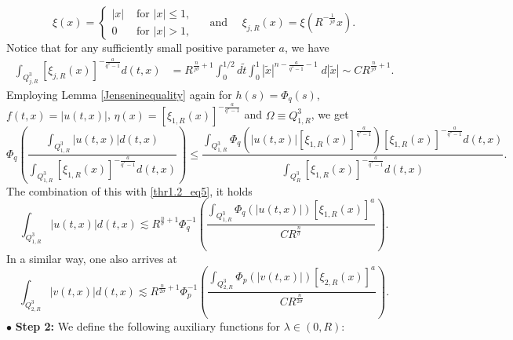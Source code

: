 \documentclass[11pt,reqno]{amsart}
\newcommand{\tron}[1]{\left( #1 \right)}
\numberwithin{equation}{section}
\begin{document}
\[
\xi(x)=
\begin{cases}
    |x| &\text{ for }|x|\leq 1, \\
    0 &\text{ for }|x|>1, 
\end{cases}
\quad \text{ and }\quad 
\xi_{j,R}(x)=\xi\tron{R^{-\frac{1}{j\sigma}}x}.
\]
Notice that for any sufficiently small positive parameter $a$, we have
\begin{align}
\int_{Q^3_{j,R}}[\xi_{j,R}(x)]^{-\frac{a}{q^*-1}}d(t,x)&=R^{\frac{n}{j\sigma}+1}\int_{0}^{1/2}d\tilde{t}\int_{0}^{1}|\tilde{x}|^{n-\frac{a}{q^*-1}-1}\;d|\tilde{x}|\sim CR^{\frac{n}{j\sigma}+1}.\label{thr1.2_eq5}
\end{align}
Employing Lemma \ref{Jenseninequality} again for $h(s)=\Phi_q(s)$, $f(t,x)=|u(t,x)|$, $\eta(x)=\left[\xi_{1,R}(x)\right]^{-\frac{a}{q^*-1}}$ and $\Omega\equiv Q^3_{1,R}$, we get
\[
\Phi_q\left(\frac{\int_{Q^3_{1,R}}|u(t,x)|d(t,x)}{\int_{Q^3_{1,R}}[\xi_{1,R}(x)]^{-\frac{a}{q^*-1}}d(t,x)}\right) \leq \frac{\int_{Q^3_{1,R}}\Phi_q\left(|u(t,x)|[\xi_{1,R}(x)]^{\frac{a}{q^*-1}}\right)[\xi_{1,R}(x)]^{-\frac{a}{q^*-1}}d(t,x)}{\int_{Q^3_R}[\xi_{1,R}(x)]^{-\frac{a}{q^*-1}}d(t,x)}.
\]
The combination of this with \eqref{thr1.2_eq5}, it holds
\begin{equation}\label{thr1.2_eq7}
\int_{Q^3_{1,R}}|u(t,x)|d(t,x)\lesssim R^{\frac{n}{\sigma}+1}\Phi^{-1}_q\tron{\frac{\int_{Q^3_{1,R}}\Phi_q\tron{|u(t,x)|}[\xi_{1,R}(x)]^{a}}{CR^{\frac{n}{\sigma}}}}.
\end{equation}
In a similar way, one also arrives at
\begin{equation}\label{thr1.2_eq8}
\int_{Q^3_{2,R}}|v(t,x)|d(t,x)\lesssim R^{\frac{n}{2\sigma}+1}\Phi^{-1}_p\tron{\frac{\int_{Q^3_{2,R}}\Phi_p\tron{|v(t,x)|}[\xi_{2,R}(x)]^{a}}{CR^{\frac{n}{2\sigma}}}}.
\end{equation}
\noindent $\bullet$ {\bf Step 2:} We define the following auxiliary functions for $\lambda\in (0,R)$:
\end{document}
